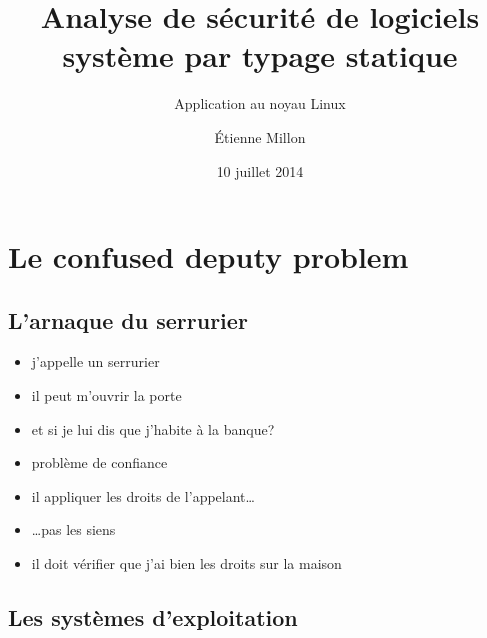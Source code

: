 \documentclass{beamer}
\title{Analyse de sécurité de logiciels système par typage statique}
\subtitle{Application au noyau Linux}
\author{Étienne Millon}
\date{10 juillet 2014}
\begin{document}

\frame{\titlepage}

\frame{\tableofcontents}

\section{Le confused deputy problem} %

\subsection{L'arnaque du serrurier}

\begin{frame}

\begin{itemize}
\item
  j'appelle un serrurier
\item
  il peut m'ouvrir la porte
\item
  et si je lui dis que j'habite à la banque?
\end{itemize}

\end{frame}
\begin{frame}

\begin{itemize}
\item problème de confiance
\item il appliquer les droits de l'appelant…
\item …pas les siens
\item il doit vérifier que j'ai bien les droits sur la maison
\end{itemize}

\end{frame}

\subsection{Les systèmes d'exploitation}
\end{document}
